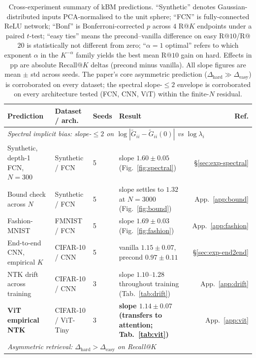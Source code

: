 \documentclass{article}
\newcommand{\Gtilde}{\widetilde{G}}
\begin{document}
\begin{table}[!htbp]
\centering
\small
\caption{Cross-experiment summary of kBM predictions. ``Synthetic''
denotes Gaussian-distributed inputs PCA-normalised to the unit
sphere; ``FCN'' is fully-connected ReLU network; ``Bonf'' is
Bonferroni-corrected $p$ across $4$ R@$K$ endpoints under a paired
$t$-test; ``easy ties'' means the precond--vanilla difference on
easy R@$10$/R@$20$ is statistically not different from zero;
``$\alpha\!=\!1$ optimal'' refers to which exponent $\alpha$ in the
$K^{-\alpha}$ family yields the best mean R@$10$ gain on hard. Effects
in pp are absolute Recall@$K$ deltas (precond minus vanilla). All
slope figures are mean $\pm$ std across seeds. The paper's core
asymmetric prediction
($\Delta_{\mathrm{hard}}\!\gg\!\Delta_{\mathrm{easy}}$) is corroborated
on every dataset; the spectral slope-$\!\le\!2$ envelope is
corroborated on every architecture tested (FCN, CNN, ViT) within
the finite-$N$ residual.}
\label{tab:cross-exp}
\begin{tabular}{p{3.0cm}p{2.6cm}p{1.4cm}p{4.4cm}r}
\toprule
Prediction & Dataset / arch. & Seeds & Result & Ref.\\
\midrule
\multicolumn{5}{l}{\emph{Spectral implicit bias: slope-$\le 2$ on $\log|\Gtilde_{ii}-\Gtilde_{ii}(0)|$ vs $\log\lambda_i$}}\\
\midrule
Synthetic, depth-1 FCN, $N\!=\!300$  & Synthetic / FCN  & 5  & slope $1.60\pm 0.05$ (Fig.~\ref{fig:spectral}) & \S\ref{sec:exp-spectral}\\
Bound check across $N$               & Synthetic / FCN  & 5  & slope settles to $1.32$ at $N\!=\!3000$ (Fig.~\ref{fig:bound}) & App.~\ref{app:bound}\\
Fashion-MNIST                        & FMNIST / FCN     & 5  & slope $1.69\pm 0.03$ (Fig.~\ref{fig:fashion}) & App.~\ref{app:fashion}\\
End-to-end CNN, empirical $K$        & CIFAR-10 / CNN   & 5  & vanilla $1.15\pm 0.07$, precond $0.97\pm 0.11$ & \S\ref{sec:exp-end2end}\\
NTK drift across training            & CIFAR-10 / CNN   & 3  & slope $1.10$--$1.28$ throughout training (Tab.~\ref{tab:drift}) & App.~\ref{app:drift}\\
\textbf{ViT empirical NTK}           & CIFAR-10 / ViT-Tiny & 3 & \textbf{slope $1.14\pm 0.07$ (transfers to attention; Tab.~\ref{tab:vit})} & App.~\ref{app:vit}\\
\midrule
\multicolumn{5}{l}{\emph{Asymmetric retrieval: $\Delta_{\mathrm{hard}}\!>\!\Delta_{\mathrm{easy}}$ on Recall@$K$}}\\

\end{tabular}
\end{table}
\end{document}
